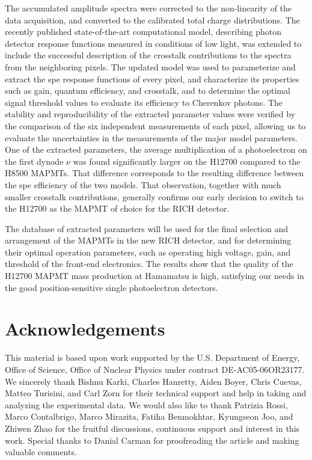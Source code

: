The accumulated amplitude spectra were corrected to the non-linearity of the data acquisition, and converted to the calibrated total charge distributions. The recently published state-of-the-art computational model, describing photon detector response functions measured in conditions of low light, was extended to include the successful description of the crosstalk contributions to the spectra from the neighboring pixels. The updated model was used to parameterize and extract the spe response functions of every pixel, and characterize its properties such as gain, quantum efficiency, and crosstalk, and to determine the optimal signal threshold values to evaluate its efficiency to Cherenkov photons. The stability and reproducibility of the extracted parameter values were verified by the comparison of the six independent measurements of each pixel, allowing us to evaluate the uncertainties in the measurements of the major model parameters. One of the extracted parameters, the average multiplication of a photoelectron on the first dynode $\nu$ was found significantly larger on the H12700 compared to the H8500 MAPMTs. That difference corresponds to the resulting difference between the spe efficiency of the two models.  That observation, together with much smaller crosstalk contributions, generally confirms our early decision to switch to the H12700 as the MAPMT of choice for the RICH detector.

The database of extracted parameters will be used for the final selection and arrangement of the MAPMTs in the new RICH detector, and for determining their optimal operation parameters, such as operating high voltage, gain, and threshold of the front-end electronics. The results show that the quality of the H12700 MAPMT mass production at Hamamatsu is high, satisfying our needs in the good position-sensitive single photoelectron detectors.



\section{Acknowledgements}
This material is based upon work supported by the U.S. Department of Energy, Office of Science, Office of Nuclear Physics under contract DE-AC05-06OR23177.
We sincerely thank 
Bishnu Karki,
Charles Hanretty,
Aiden Boyer,
Chris  Cuevas,
Matteo Turisini, and
Carl Zorn
for their technical support and help in taking and analyzing the experimental data. We would
also like to thank 
Patrizia Rossi, 
Marco Contalbrigo, 
Marco Mirazita,
Fatiha Benmokhtar,
Kyungseon Joo,
and Zhiwen Zhao
for the fruitful discussions, continuous support and interest in this work. Special thanks to Danial Carman for proofreading the article and making valuable comments.